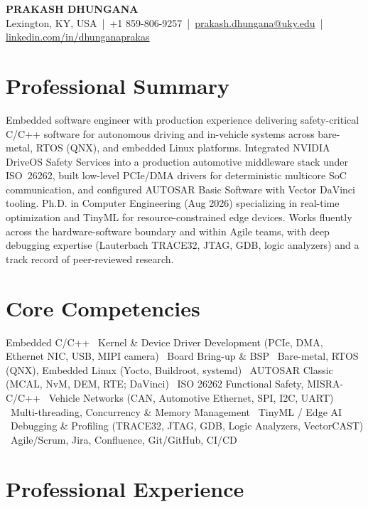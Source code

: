 \documentclass[10pt,letterpaper]{article}
\begin{document}
\begin{center}
  {\LARGE\bfseries PRAKASH DHUNGANA}\\[3pt]
  Lexington, KY, USA \,|\, +1 859-806-9257 \,|\,
  \href{mailto:prakash.dhungana@uky.edu}{prakash.dhungana@uky.edu} \,|\,
  \href{https://linkedin.com/in/dhunganaprakas}{\underline{linkedin.com/in/dhunganaprakas}}
\end{center}

\section{Professional Summary}
Embedded software engineer with production experience delivering safety-critical C/C++ software for autonomous driving and in-vehicle systems across bare-metal, RTOS (QNX), and embedded Linux platforms. Integrated NVIDIA DriveOS Safety Services into a production automotive middleware stack under ISO~26262, built low-level PCIe/DMA drivers for deterministic multicore SoC communication, and configured AUTOSAR Basic Software with Vector DaVinci tooling. Ph.D. in Computer Engineering (Aug 2026) specializing in real-time optimization and TinyML for resource-constrained edge devices. Works fluently across the hardware-software boundary and within Agile teams, with deep debugging expertise (Lauterbach TRACE32, JTAG, GDB, logic analyzers) and a track record of peer-reviewed research.

\section{Core Competencies}
Embedded C/C++ \textbullet\ Kernel \& Device Driver Development (PCIe, DMA, Ethernet NIC, USB, MIPI camera) \textbullet\ Board Bring-up \& BSP \textbullet\ Bare-metal, RTOS (QNX), Embedded Linux (Yocto, Buildroot, systemd) \textbullet\ AUTOSAR Classic (MCAL, NvM, DEM, RTE; DaVinci) \textbullet\ ISO 26262 Functional Safety, MISRA-C/C++ \textbullet\ Vehicle Networks (CAN, Automotive Ethernet, SPI, I2C, UART) \textbullet\ Multi-threading, Concurrency \& Memory Management \textbullet\ TinyML / Edge AI \textbullet\ Debugging \& Profiling (TRACE32, JTAG, GDB, Logic Analyzers, VectorCAST) \textbullet\ Agile/Scrum, Jira, Confluence, Git/GitHub, CI/CD

\section{Professional Experience}
\end{document}
